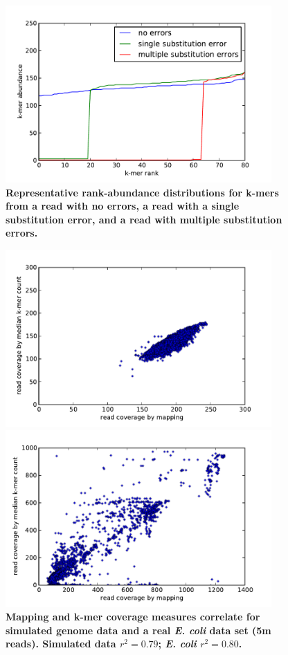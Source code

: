 \documentclass[10pt]{article}
\begin{document}
\begin{figure}
\centerline{\includegraphics[width=4in]{diginorm-ranks.pdf}}
\caption{
{\bf Representative rank-abundance distributions for k-mers from a read with no errors,
a read with a single substitution error, and a read with multiple
substitution errors.}}
\label{fig:rankabund}
\end{figure}

\begin{figure}[!ht]
\begin{center}
\centerline{\includegraphics[width=4in]{diginorm-sim-genome.pdf}}
\centerline{\includegraphics[width=4in]{diginorm-ecoli-genome.pdf}}
\end{center}
\caption{
{\bf Mapping and k-mer coverage measures correlate for simulated genome
data and a real {\em E. coli} data set (5m reads).  Simulated data $r^2 = 0.79$; {\em
E. coli} $r^2 = 0.80$.}
}
\label{fig:random}
\end{figure}
\end{document}
